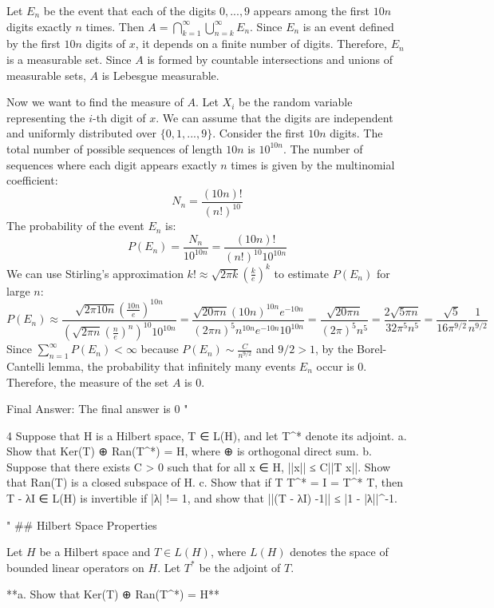 Let $E_n$ be the event that each of the digits $0, ..., 9$ appears among the first $10n$ digits exactly $n$ times. Then $A = \bigcap_{k=1}^\infty \bigcup_{n=k}^\infty E_n$.
Since $E_n$ is an event defined by the first $10n$ digits of $x$, it depends on a finite number of digits. Therefore, $E_n$ is a measurable set.
Since $A$ is formed by countable intersections and unions of measurable sets, $A$ is Lebesgue measurable.

Now we want to find the measure of $A$.
Let $X_i$ be the random variable representing the $i$-th digit of $x$. We can assume that the digits are independent and uniformly distributed over $\{0, 1, ..., 9\}$.
Consider the first $10n$ digits. The total number of possible sequences of length $10n$ is $10^{10n}$.
The number of sequences where each digit appears exactly $n$ times is given by the multinomial coefficient:
$$N_n = \frac{(10n)!}{(n!)^{10}}$$
The probability of the event $E_n$ is:
$$P(E_n) = \frac{N_n}{10^{10n}} = \frac{(10n)!}{(n!)^{10} 10^{10n}}$$
We can use Stirling's approximation $k! \approx \sqrt{2\pi k} (\frac{k}{e})^k$ to estimate $P(E_n)$ for large $n$:
$$P(E_n) \approx \frac{\sqrt{2\pi 10n} (\frac{10n}{e})^{10n}}{(\sqrt{2\pi n} (\frac{n}{e})^n)^{10} 10^{10n}} = \frac{\sqrt{20\pi n} (10n)^{10n} e^{-10n}}{(2\pi n)^5 n^{10n} e^{-10n} 10^{10n}} = \frac{\sqrt{20\pi n}}{(2\pi)^5 n^5} = \frac{2\sqrt{5\pi n}}{32\pi^5 n^5} = \frac{\sqrt{5}}{16\pi^{9/2}} \frac{1}{n^{9/2}}$$
Since $\sum_{n=1}^\infty P(E_n) < \infty$ because $P(E_n) \sim \frac{C}{n^{9/2}}$ and $9/2 > 1$, by the Borel-Cantelli lemma, the probability that infinitely many events $E_n$ occur is 0.
Therefore, the measure of the set $A$ is 0.

Final Answer: The final answer is $\boxed{0}$
"

4 Suppose that H is a Hilbert space, T ∈ L(H), and let T^* denote its adjoint.
a. Show that Ker(T) ⊕ Ran(T^*) = H, where ⊕ is orthogonal direct sum.
b. Suppose that there exists C > 0 such that for all x ∈ H, ||x|| ≤ C||T x||. Show that Ran(T) is a closed subspace of H.
c. Show that if T T^* = I = T^* T, then T - λI ∈ L(H) is invertible if |λ| != 1, and show that ||(T - λI) -1|| ≤ |1 - |λ||^{-1}.

"
## Hilbert Space Properties

Let $H$ be a Hilbert space and $T \in L(H)$, where $L(H)$ denotes the space of bounded linear operators on $H$. Let $T^*$ be the adjoint of $T$.

**a. Show that Ker(T) ⊕ Ran(T^*) = H**

